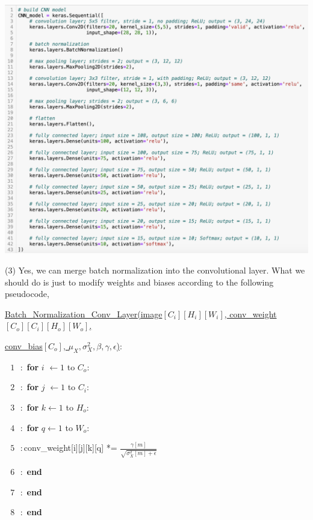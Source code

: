 \documentclass[11pt]{article}
\begin{document}
\begin{solution}
\begin{center}
\includegraphics[width=15cm]{code.png}
\end{center}
\item(3) Yes, we can merge batch normalization into the convolutional layer. What we should do is just to modify weights and biases according to the following pseudocode,
 \item \qquad \underline{Batch\_Normalization\_Conv\_Layer(image$[C_{i}][H_{i}][W_{i}]$, conv\_weight$[C_o][C_i][H_o][W_o]$,} 
\item \qquad \underline{conv\_bias$[C_o]$, $\mu_X, \sigma_X^2, \beta, \gamma, \epsilon$)}:
\item \qquad $\text{  } 1 \text{   }:$\textbf{ for} $i$ $\leftarrow 1$ to $C_o$:
\item \qquad $\text{  } 2 \text{   }:$\qquad \textbf{ for} $j$ $\leftarrow 1$ to $C_i$:
\item \qquad $\text{  } 3 \text{   }:$\qquad \qquad  \textbf{ for} $k \leftarrow 1$ to $H_o$: 
\item \qquad $\text{  } 4 \text{   }:$\qquad  \qquad \qquad  \textbf{ for} $q \leftarrow 1$ to $W_o$: 
\item \qquad $\text{  } 5 \text{   }:$\qquad  \qquad \qquad \qquad conv\_weight[i][j][k][q] *= $\frac{\gamma[m]}{\sqrt{\sigma_X^2[m]+\epsilon}}$
\item \qquad $\text{  } 6 \text{   }:$\qquad \qquad \qquad \textbf{ end}
\item \qquad $\text{  } 7 \text{   }:$ \qquad \qquad \textbf{ end}
\item \qquad $\text{  } 8 \text{   }:$ \qquad \textbf{ end}

\end{solution}
\end{document}
